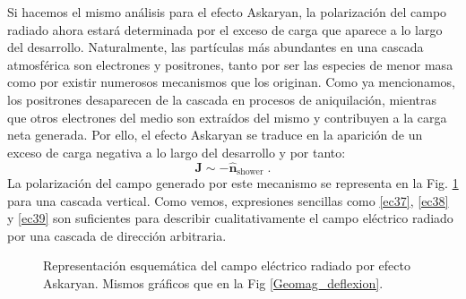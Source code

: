 \documentclass[11 pt, a4paper]{article} %
\numberwithin{equation}{section}
\numberwithin{figure}{section}
\numberwithin{table}{section}
\newcommand{\vect}[1]{\boldsymbol{\mathbf{#1}}}
\begin{document}
Si hacemos el mismo análisis para el efecto Askaryan, la polarización del campo radiado ahora estará determinada por el exceso de carga que aparece a lo largo del desarrollo. Naturalmente, las partículas más abundantes en una cascada atmosférica son electrones y positrones, tanto por ser las especies de menor masa como por existir numerosos mecanismos que los originan. Como ya mencionamos, los positrones desaparecen de la cascada en procesos de aniquilación, mientras que otros electrones del medio son extraídos del mismo y contribuyen a la carga neta generada. Por ello, el efecto Askaryan se traduce en la aparición de un exceso de carga negativa a lo largo del desarrollo y por tanto:
\begin{equation}
	\vect{J}\sim -\hat{\vect{n}}_{\text{shower}}\;.\label{ec39}
\end{equation}
La polarización del campo generado por este mecanismo se representa en la Fig. \ref{Askaryan} para una cascada vertical. Como vemos, expresiones sencillas como \eqref{ec37}, \eqref{ec38} y \eqref{ec39} son suficientes para describir cualitativamente el campo eléctrico radiado por una cascada de dirección arbitraria.
\begin{figure}[H]
	\centering
	\hspace{10mm}
	\caption{Representación esquemática del campo eléctrico radiado por efecto Askaryan. Mismos gráficos que en la Fig \ref{Geomag_deflexion}.}
	\label{Askaryan}
\end{figure}
\end{document}
